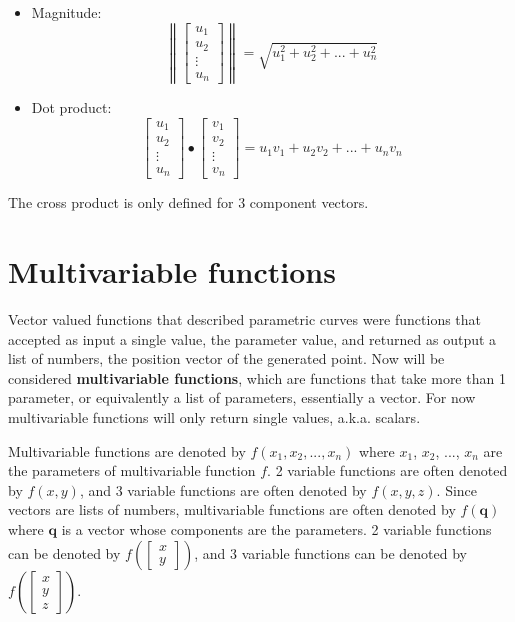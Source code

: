 \documentclass{article}
\begin{document}
\begin{itemize}
\item Magnitude:
\[\left\|\begin{bmatrix} u_1 \\ u_2 \\ \vdots \\ u_n \end{bmatrix}\right\| = \sqrt{u_1^2 + u_2^2 + ... + u_n^2}\] 
\item Dot product:
\[\begin{bmatrix} u_1 \\ u_2 \\ \vdots \\ u_n \end{bmatrix} \bullet \begin{bmatrix} v_1 \\ v_2 \\ \vdots \\ v_n \end{bmatrix} = u_1 v_1 + u_2 v_2 + ... + u_n v_n \]
\end{itemize}
The cross product is only defined for \(3\) component vectors.


\section*{Multivariable functions}

Vector valued functions that described parametric curves were functions that accepted as input a single value, the parameter value, and returned as output a list of numbers, the position vector of the generated point. Now will be considered {\bf multivariable functions}, which are functions that take more than 1 parameter, or equivalently a list of parameters, essentially a vector. For now multivariable functions will only return single values, a.k.a. scalars.   

Multivariable functions are denoted by \(f(x_1, x_2, ..., x_n)\) where \(x_1\), \(x_2\), ..., \(x_n\) are the parameters of multivariable function \(f\). 2 variable functions are often denoted by \(f(x,y)\), and 3 variable functions are often denoted by \(f(x,y,z)\). Since vectors are lists of numbers, multivariable functions are often denoted by \(f(\mathbf{q})\) where \(\mathbf{q}\) is a vector whose components are the parameters. 2 variable functions can be denoted by \(f\left(\begin{bmatrix} x \\ y \end{bmatrix}\right)\), and 3 variable functions can be denoted by \(f\left(\begin{bmatrix} x \\ y \\ z \end{bmatrix}\right)\).
\end{document}
